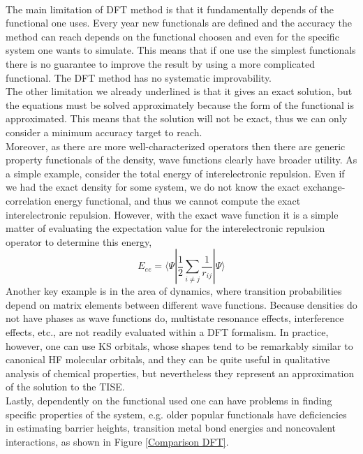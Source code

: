 \\
The main limitation of DFT method is that it fundamentally depends of the functional one uses. Every year new functionals are defined and the accuracy the method can reach depends on the functional choosen and even for the specific system one wants to simulate. This means that if one use the simplest functionals there is no guarantee to improve the result by using a more complicated functional. The DFT method has no systematic improvability. \\
The other limitation we already underlined is that it gives an exact solution, but the equations must be solved approximately because the form of the functional is approximated. This means that the solution will not be exact, thus we can only consider a minimum accuracy target to reach. \\
Moreover, as there are more well-characterized operators then there are generic property functionals of the density, wave functions clearly have broader utility. As a simple example, consider the total energy of interelectronic repulsion. Even if we had the exact density for some system, we do not know the exact exchange-correlation energy functional, and thus we cannot compute the exact interelectronic repulsion. However, with the exact wave function it is a simple matter of evaluating the expectation value for the interelectronic repulsion operator to determine this energy, 
\begin{equation}
    E_{ee} = \langle\Psi| \frac12 \sum_{i \neq j} \frac{1}{r_{ij}} |\Psi\rangle
\end{equation}
Another key example is in the area of dynamics, where transition probabilities depend on matrix elements between different wave functions. Because densities do not have phases as wave functions do, multistate resonance effects, interference effects, etc., are not readily evaluated within a DFT formalism. In practice, however, one can use KS orbitals, whose shapes tend to be remarkably similar to canonical HF molecular orbitals, and they can be quite useful in qualitative analysis of chemical properties, but nevertheless they represent an approximation of the solution to the TISE. \\
Lastly, dependently on the functional used one can have problems in finding specific properties of the system, e.g. older popular functionals have deficiencies in estimating barrier heights, transition metal bond energies and noncovalent interactions, as shown in Figure \ref{Comparison DFT}. \\
